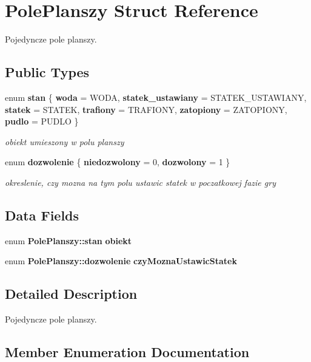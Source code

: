 \section{Pole\+Planszy Struct Reference}
\label{struct_pole_planszy}


Pojedyncze pole planszy.  


\subsection*{Public Types}
\begin{DoxyCompactItemize}
\item 
enum \textbf{ stan} \{ \newline
\textbf{ woda} = W\+O\+DA, 
\textbf{ statek\+\_\+ustawiany} = S\+T\+A\+T\+E\+K\+\_\+\+U\+S\+T\+A\+W\+I\+A\+NY, 
\textbf{ statek} = S\+T\+A\+T\+EK, 
\textbf{ trafiony} = T\+R\+A\+F\+I\+O\+NY, 
\newline
\textbf{ zatopiony} = Z\+A\+T\+O\+P\+I\+O\+NY, 
\textbf{ pudlo} = P\+U\+D\+LO
 \}\begin{DoxyCompactList}\small\item\em obiekt umieszony w polu planszy \end{DoxyCompactList}
\item 
enum \textbf{ dozwolenie} \{ \textbf{ niedozwolony} = 0, 
\textbf{ dozwolony} = 1
 \}\begin{DoxyCompactList}\small\item\em okreslenie, czy mozna na tym polu ustawic statek w poczatkowej fazie gry \end{DoxyCompactList}
\end{DoxyCompactItemize}
\subsection*{Data Fields}
\begin{DoxyCompactItemize}
\item 
enum \textbf{ Pole\+Planszy\+::stan} \textbf{ obiekt}
\item 
enum \textbf{ Pole\+Planszy\+::dozwolenie} \textbf{ czy\+Mozna\+Ustawic\+Statek}
\end{DoxyCompactItemize}


\subsection{Detailed Description}
Pojedyncze pole planszy. 

\subsection{Member Enumeration Documentation}
\mbox{\label{struct_pole_planszy_a11e5d9d8d4cd509fab8200a06666c63a}} 
